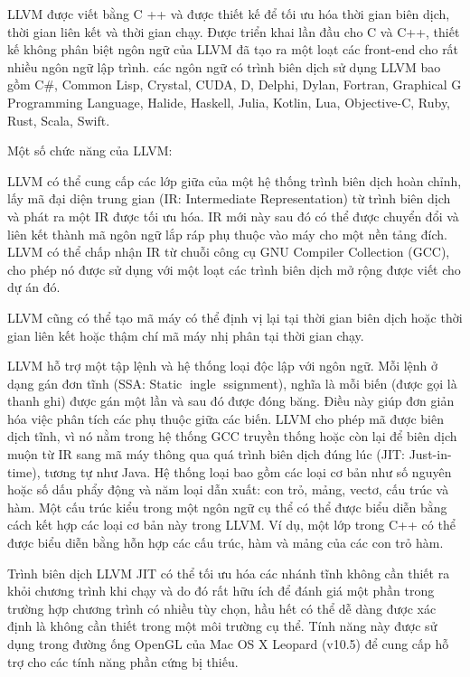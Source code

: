 \documentclass[12pt,a4paper]{article}
\begin{document}
LLVM được viết bằng C ++ và được thiết kế để tối ưu hóa thời gian biên dịch, thời gian liên kết và thời gian chạy. Được triển khai lần đầu cho C và C++, thiết kế không phân biệt ngôn ngữ của LLVM đã tạo ra một loạt các front-end cho rất nhiều ngôn ngữ lập trình. các ngôn ngữ có trình biên dịch sử dụng LLVM bao gồm C\#, Common Lisp, Crystal, CUDA, D, Delphi, Dylan, Fortran, Graphical G Programming Language, Halide, Haskell, Julia, Kotlin, Lua, Objective-C, Ruby, Rust, Scala, Swift.

Một số chức năng của LLVM:

LLVM có thể cung cấp các lớp giữa của một hệ thống trình biên dịch hoàn chỉnh, lấy mã đại diện trung gian (IR: Intermediate Representation) từ trình biên dịch và phát ra một IR được tối ưu hóa. IR mới này sau đó có thể được chuyển đổi và liên kết thành mã ngôn ngữ lắp ráp phụ thuộc vào máy cho một nền tảng đích. LLVM có thể chấp nhận IR từ chuỗi công cụ GNU Compiler Collection (GCC), cho phép nó được sử dụng với một loạt các trình biên dịch mở rộng được viết cho dự án đó.

LLVM cũng có thể tạo mã máy có thể định vị lại tại thời gian biên dịch hoặc thời gian liên kết hoặc thậm chí mã máy nhị phân tại thời gian chạy.

LLVM hỗ trợ một tập lệnh và hệ thống loại độc lập với ngôn ngữ. Mỗi lệnh ở dạng gán đơn tĩnh (SSA: Static ingle ssignment), nghĩa là mỗi biến (được gọi là thanh ghi) được gán một lần và sau đó được đóng băng. Điều này giúp đơn giản hóa việc phân tích các phụ thuộc giữa các biến. LLVM cho phép mã được biên dịch tĩnh, vì nó nằm trong hệ thống GCC truyền thống hoặc còn lại để biên dịch muộn từ IR sang mã máy thông qua quá trình biên dịch đúng lúc (JIT: Just-in-time), tương tự như Java. Hệ thống loại bao gồm các loại cơ bản như số nguyên hoặc số dấu phẩy động và năm loại dẫn xuất: con trỏ, mảng, vectơ, cấu trúc và hàm. Một cấu trúc kiểu trong một ngôn ngữ cụ thể có thể được biểu diễn bằng cách kết hợp các loại cơ bản này trong LLVM. Ví dụ, một lớp trong C++ có thể được biểu diễn bằng hỗn hợp các cấu trúc, hàm và mảng của các con trỏ hàm.

Trình biên dịch LLVM JIT có thể tối ưu hóa các nhánh tĩnh không cần thiết ra khỏi chương trình khi chạy và do đó rất hữu ích để đánh giá một phần trong trường hợp chương trình có nhiều tùy chọn, hầu hết có thể dễ dàng được xác định là không cần thiết trong một môi trường cụ thể. Tính năng này được sử dụng trong đường ống OpenGL của Mac OS X Leopard (v10.5) để cung cấp hỗ trợ cho các tính năng phần cứng bị thiếu.
\end{document}
